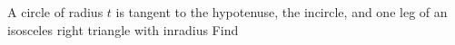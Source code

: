 A circle of radius $t$ is tangent to the hypotenuse, the incircle, and one leg of an isosceles right triangle with inradius   Find 